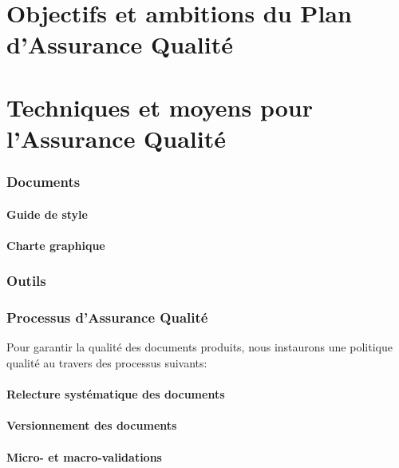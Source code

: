 \part{Objectifs et ambitions du Plan d'Assurance Qualité}

\part{Techniques et moyens pour l'Assurance Qualité}

\section{Documents}

\subsection{Guide de style}
\subsection{Charte graphique}

\section{Outils}

\section{Processus d'Assurance Qualité}

Pour garantir la qualité des documents produits, nous instaurons une politique qualité au travers des processus suivants:

\subsection{Relecture systématique des documents}
\subsection{Versionnement des documents}
\subsection{Micro- et macro-validations}
